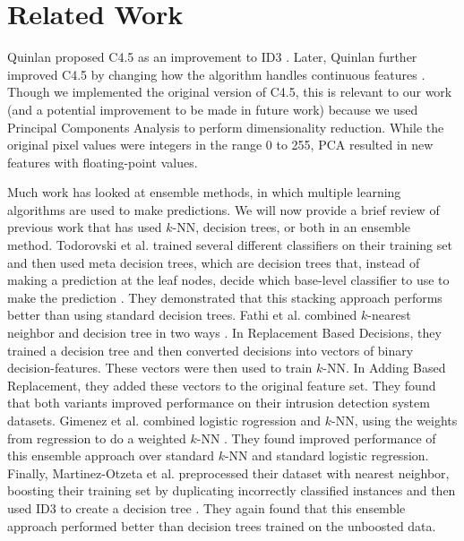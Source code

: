 \section{Related Work}
Quinlan proposed C4.5 as an improvement to ID3 \cite{quinlan2014c4}. Later, Quinlan further improved C4.5 by changing how the algorithm handles continuous features \cite{quinlan1996improved}. Though we implemented the original version of C4.5, this is relevant to our work (and a potential improvement to be made in future work) because we used Principal Components Analysis to perform dimensionality reduction.  While the original pixel values were integers in the range 0 to 255, PCA resulted in new features with floating-point values.

Much work has looked at ensemble methods, in which multiple learning algorithms are used to make predictions. We will now provide a brief review of previous work that has used $k$-NN, decision trees, or both in an ensemble method. Todorovski et al. trained several different classifiers on their training set and then used meta decision trees, which are decision trees that, instead of making a prediction at the leaf nodes, decide which base-level classifier to use to make the prediction \cite{todorovski2003combining}. They demonstrated that this stacking approach performs better than using standard decision trees.
Fathi et al. combined $k$-nearest neighbor and decision tree in two ways \cite{FathiMazinani}. In Replacement Based Decisions, they trained a decision tree and then converted decisions into vectors of binary decision-features. These vectors were then used to train $k$-NN. In Adding Based Replacement, they added these vectors to the original feature set. They found that both variants improved performance on their intrusion detection system datasets.
Gimenez et al. combined logistic rogression and $k$-NN, using the weights from regression to do a weighted $k$-NN \cite{campillo2013improving}. They found improved performance of this ensemble approach over standard $k$-NN and standard logistic regression. Finally, Martinez-Otzeta et al. preprocessed their dataset with nearest neighbor, boosting their training set by duplicating incorrectly classified instances and then used ID3 to create a decision tree \cite{martinezk}. They again found that this ensemble approach performed better than decision trees trained on the unboosted data. 
